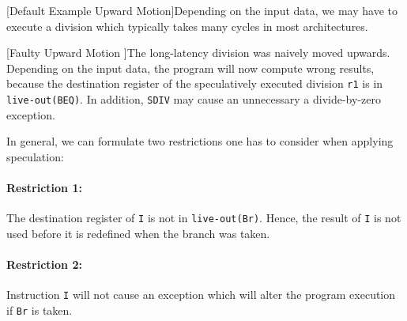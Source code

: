\begin{center}
    \begin{minipage}{.45\textwidth}
        \centering
        
        \captionsetup{type=listing}
        [Default Example Upward Motion]{Depending on the input data, we may have to execute a division which typically takes many cycles in most architectures.}
        \label{ls:ls_upward_default}
    \end{minipage}\hfill
    \begin{minipage}{.45\textwidth}
        \centering
        
        \captionsetup{type=listing}
        [Faulty Upward Motion ]{The long-latency division was naively moved upwards. Depending on the input data, the program will now compute wrong results, because the destination register of the speculatively executed division \texttt{r1} is in \texttt{live-out(BEQ)}. In addition, \texttt{SDIV} may cause an unnecessary a divide-by-zero exception.}
        \label{ls:ls_upward_faulty}
    \end{minipage}
\end{center}

In general, we can formulate two restrictions one has to consider when applying speculation: 
\paragraph{Restriction 1:} The destination register of \texttt{I} is not in \texttt{live-out(Br)}. Hence, the result of \texttt{I} is not used before it is redefined when the branch was taken.
\paragraph{Restriction 2:} Instruction \texttt{I} will not cause an exception which will alter the program execution if \texttt{Br} is taken. 
\\ \\ 

